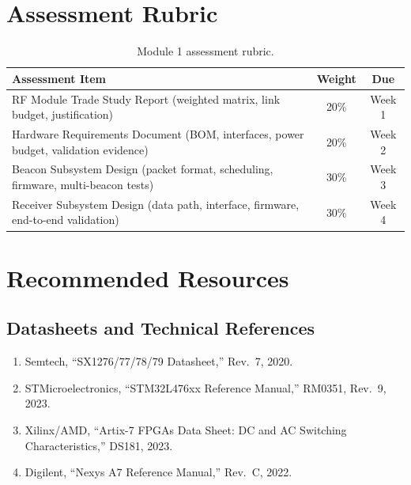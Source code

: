 \documentclass[11pt,letterpaper]{article}
\begin{document}
	\section{Assessment Rubric}
	
	\begin{table}[ht!]
		\centering
		\caption{Module 1 assessment rubric.}
		\label{tab:rubric}
		\renewcommand{\arraystretch}{1.3}
		\begin{tabularx}{\textwidth}{X c c}
			\toprule
			\textbf{Assessment Item} & \textbf{Weight} & \textbf{Due} \\
			\midrule
			RF Module Trade Study Report (weighted matrix, link budget, justification) & 20\% & Week 1 \\
			Hardware Requirements Document (BOM, interfaces, power budget, validation evidence) & 20\% & Week 2 \\
			Beacon Subsystem Design (packet format, scheduling, firmware, multi-beacon tests) & 30\% & Week 3 \\
			Receiver Subsystem Design (data path, interface, firmware, end-to-end validation) & 30\% & Week 4 \\
			\bottomrule
		\end{tabularx}
	\end{table}
	
	\section{Recommended Resources}
	
	\subsection{Datasheets and Technical References}
	
	\begin{enumerate}[leftmargin=2em]
		\item Semtech, ``SX1276/77/78/79 Datasheet,'' Rev.\ 7, 2020.
		\item STMicroelectronics, ``STM32L476xx Reference Manual,'' RM0351, Rev.\ 9, 2023.
		\item Xilinx/AMD, ``Artix-7 FPGAs Data Sheet: DC and AC Switching Characteristics,'' DS181, 2023.
		\item Digilent, ``Nexys A7 Reference Manual,'' Rev.\ C, 2022.
	\end{enumerate}
	
\end{document}

